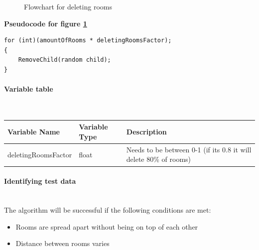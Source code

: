 \documentclass{article}
\newcommand{\myparagraph}[1]{\paragraph{#1}\mbox{}\\} %
\newcommand{\smallBr}{\vspace{1.5mm}}
\begin{document}
\begin{figure}[h]
  \centering
  \caption{Flowchart for deleting rooms}
  \label{deleting flowchart}
\end{figure}

\textbf{Pseudocode for figure \ref{deleting flowchart}}
\begin{lstlisting}
for (int)(amountOfRooms * deletingRoomsFactor);
{
    RemoveChild(random child);
}
\end{lstlisting}

\myparagraph{Variable table}
\smallBr
\begin{tabular}{l|l|l}
Variable Name       & Variable Type & Description                                                         \\ \hline
deletingRoomsFactor & float         & Needs to be between 0-1 (if its 0.8 it will delete 80\% of rooms)
\end{tabular}

\myparagraph{Identifying test data}
The algorithm will be successful if the following conditions are met:
\begin{itemize}
\item{Rooms are spread apart without being on top of each other}
\item{Distance between rooms varies}
\end{itemize}
\end{document}
